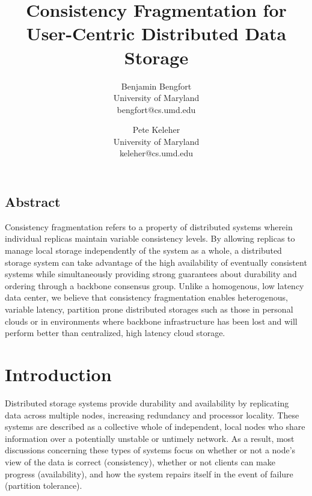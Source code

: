 \documentclass[letterpaper,twocolumn,10pt]{article}
\begin{document}
\date{}

\title{\Large \bf Consistency Fragmentation for User-Centric Distributed Data Storage}

\author{
{\rm Benjamin Bengfort}\\
University of Maryland\\
bengfort@cs.umd.edu
\and
{\rm Pete Keleher}\\
University of Maryland\\
keleher@cs.umd.edu
} %

\maketitle



\subsection*{Abstract}

Consistency fragmentation refers to a property of distributed systems wherein individual replicas maintain variable consistency levels. By allowing replicas to manage local storage independently of the system as a whole, a distributed storage system can take advantage of the high availability of eventually consistent systems while simultaneously providing strong guarantees about durability and ordering through a backbone consensus group. Unlike a homogenous, low latency data center, we believe that consistency fragmentation enables heterogenous, variable latency, partition prone distributed storages such as those in personal clouds or in environments where backbone infrastructure has been lost and will perform better than centralized, high latency cloud storage.

\section{Introduction}


Distributed storage systems provide durability and availability by replicating data across multiple nodes, increasing redundancy and processor locality. These systems are described as a collective whole of independent, local nodes who share information over a potentially unstable or untimely network. As a result, most discussions concerning these types of systems focus on whether or not a node's view of the data is correct (consistency), whether or not clients can make progress (availability), and how the system repairs itself in the event of failure (partition tolerance).
\end{document}
